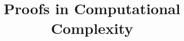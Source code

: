 \documentclass{acmedraft}
\begin{document}
\title{Proofs in Computational Complexity}

\maketitle

\tableofcontents
\end{document}
